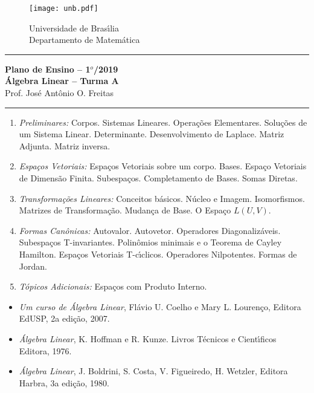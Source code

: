 \documentclass[12pt]{article}
\begin{document}
\pagestyle{empty}

\begin{figure}[h]
    \begin{minipage}[c]{1.7cm}
    \texttt{[image: unb.pdf]}
    \end{minipage}%
    \hspace{0pt}
    \begin{minipage}[c]{4in}
    {Universidade de Bras{{\'\i}}lia} \\
    {Departamento de Matem\'atica}
    \end{minipage}
\end{figure}
\vspace{-0.9cm}
\hrule

\begin{center}
{\large\bf Plano de Ensino -- 1$^{o}$/2019} \\
{\large\bf \'Algebra Linear -- Turma A}\\
Prof. Jos\'e Ant\^onio O. Freitas
\end{center}
\hrule
\vspace{0.25cm}
\begin{enumerate}[1)]
\item \textit{Preliminares:} Corpos. Sistemas Lineares. Opera\c{c}\~oes Elementares. Solu\c{c}\~oes de um Sistema Linear. Determinante. Desenvolvimento de Laplace. Matriz Adjunta. Matriz inversa.

\item \textit{Espa\c{c}os Vetoriais:} Espa\c{c}os Vetoriais sobre um corpo. Bases. Espa\c{c}o Vetoriais de Dimens\~ao Finita. Subespa\c{c}os. Completamento de Bases. Somas Diretas.


\item \textit{Transforma\c{c}\~oes Lineares:} Conceitos b\'asicos. N\'ucleo e Imagem. Isomorfismos. Matrizes de Transforma\c{c}\~ao. Mudan\c{c}a de Base. O Espa\c{c}o $L(U,V)$.

\item \textit{Formas Can\^onicas:} Autovalor. Autovetor. Operadores Diagonaliz\'aveis. Subespa\c{c}os T-invariantes. Polin\^omios minimais e o Teorema de Cayley Hamilton. Espa\c{c}os Vetoriais T-c{\'\i}clicos. Operadores Nilpotentes. Formas de Jordan.

\item \textit{T\'opicos Adicionais:} Espa\c{c}os com Produto Interno.

\end{enumerate}

\begin{itemize}
 \item \textit{Um curso de \'Algebra Linear}, Fl\'avio U. Coelho e Mary L. Louren\c{c}o,  Editora EdUSP, 2a edi\c{c}\~ao, 2007. 

\item \textit{\'Algebra Linear}, K. Hoffman e R. Kunze. Livros T\'ecnicos e Cient{\'\i}ficos Editora, 1976.

\item \textit{\'Algebra Linear}, J. Boldrini, S. Costa, V. Figueiredo, H. Wetzler, Editora Harbra, 3a edi\c{c}\~ao, 1980.

\end{itemize}
\end{document}
